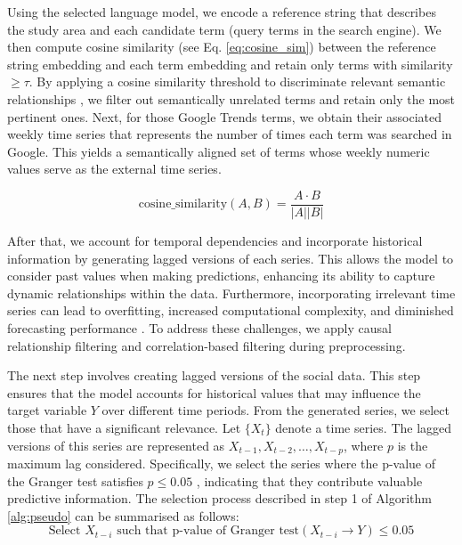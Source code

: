 \documentclass[acmsmall]{acmart}
\begin{document}
{\color{black}Using the selected language model, we encode a reference string that describes the study area and each candidate term (query terms in the search engine)}. We then compute cosine similarity (see Eq. \ref{eq:cosine_sim}) between the reference string embedding and each term embedding and retain only terms with similarity $\ge \tau$. By applying a cosine similarity threshold to discriminate relevant semantic relationships \cite{reimers2019sentence}, we filter out semantically unrelated terms and retain only the most pertinent ones. {\color{black}Next, for those Google Trends terms, we obtain their associated weekly time series that represents the number of times each term was searched in Google. This yields a semantically aligned set of terms whose weekly numeric values serve as the external time series.}

\begin{equation} \label{eq:cosine_sim}
  \text{cosine\_similarity}(A, B) = \frac{A \cdot B}{|A| |B|}
\end{equation}

After that, we account for temporal dependencies and incorporate historical information by generating lagged versions of each series. This allows the model to consider past values when making predictions, enhancing its ability to capture dynamic relationships within the data. Furthermore, incorporating irrelevant time series can lead to overfitting, increased computational complexity, and diminished forecasting performance \cite{hyndman2018forecasting}. To address these challenges, we apply causal relationship filtering and correlation-based filtering during preprocessing. 




The next step involves creating lagged versions of the social data. This step ensures that the model accounts for historical values that may influence the target variable $Y$ over different time periods. From the generated series, we select those that have a significant relevance.
Let $\{X_t\}$ denote a time series. The lagged versions of this series are represented as $X_{t-1}, X_{t-2}, \dots, X_{t-p}$, where $p$ is the maximum lag considered. Specifically, we select the series where the p-value of the Granger test satisfies $p \leq 0.05$ \cite{bruns2019lag}, indicating that they contribute valuable predictive information. The selection process described in step 1 of Algorithm \ref{alg:pseudo} can be summarised as follows:
\begin{equation} \label{eq:equation_causality}
    \text{Select } X_{t-i} \text{ such that } \text{p-value of Granger test}(X_{t-i} \to Y) \leq 0.05
\end{equation}
\end{document}
